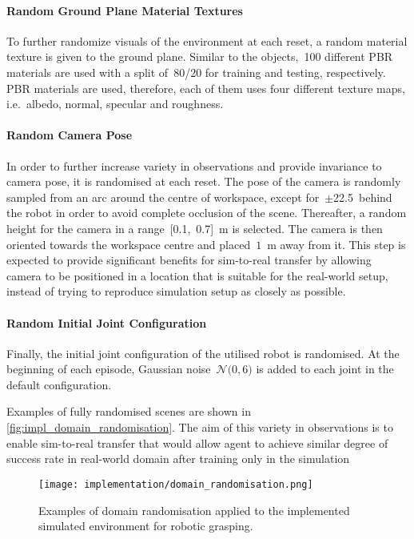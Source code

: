 \paragraph{Random Ground Plane Material Textures} To further randomize visuals of the environment at each reset, a random material texture is given to the ground plane. Similar to the objects,~100 different PBR materials are used with a split of~80/20 for training and testing, respectively. PBR materials are used, therefore, each of them uses four different texture maps, i.e.~albedo, normal, specular and roughness.

\paragraph{Random Camera Pose} In order to further increase variety in observations and provide invariance to camera pose, it is randomised at each reset. The pose of the camera is randomly sampled from an arc around the centre of workspace, except for~\(\pm\)22.5\textdegree\ behind the robot in order to avoid complete occlusion of the scene. Thereafter, a random height for the camera in a range~[0.1,~0.7]~m is selected. The camera is then oriented towards the workspace centre and placed~\(1\)~m away from it. This step is expected to provide significant benefits for sim-to-real transfer by allowing camera to be positioned in a location that is suitable for the real-world setup, instead of trying to reproduce simulation setup as closely as possible.

\paragraph{Random Initial Joint Configuration} Finally, the initial joint configuration of the utilised robot is randomised. At the beginning of each episode, Gaussian noise~\(\mathcal{N}(0, 6\)\textdegree\()\) is added to each joint in the default configuration.

Examples of fully randomised scenes are shown in \autoref{fig:impl_domain_randomisation}. The aim of this variety in observations is to enable sim-to-real transfer that would allow agent to achieve similar degree of success rate in real-world domain after training only in the simulation

\begin{figure}[ht]
    \centering
    \texttt{[image: implementation/domain\_randomisation.png]}
    \caption{Examples of domain randomisation applied to the implemented simulated environment for robotic grasping.}
    \label{fig:impl_domain_randomisation}
\end{figure}


